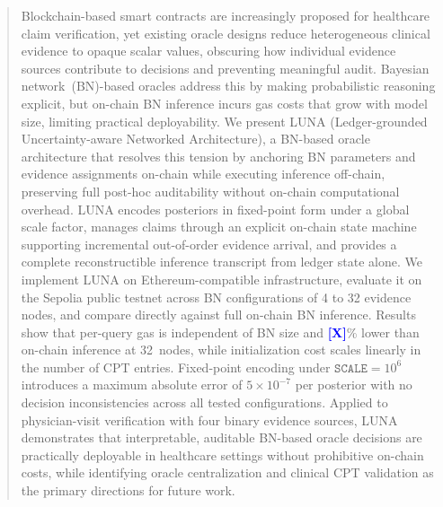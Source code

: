 \documentclass[journal]{IEEEtran}
\newcommand{\placeholder}[1]{\textcolor{blue}{\textbf{[#1]}}}
\begin{document}
\begin{abstract}
Blockchain-based smart contracts are increasingly proposed
for healthcare claim verification, yet existing oracle designs
reduce heterogeneous clinical evidence to opaque scalar values,
obscuring how individual evidence sources contribute to
decisions and preventing meaningful audit.
Bayesian network~(BN)-based oracles address this by making
probabilistic reasoning explicit, but on-chain BN inference
incurs gas costs that grow with model size, limiting practical
deployability.
We present LUNA (Ledger-grounded Uncertainty-aware Networked
Architecture), a BN-based oracle architecture that resolves
this tension by anchoring BN parameters and evidence
assignments on-chain while executing inference off-chain,
preserving full post-hoc auditability without on-chain
computational overhead.
LUNA encodes posteriors in fixed-point form under a global
scale factor, manages claims through an explicit on-chain
state machine supporting incremental out-of-order evidence
arrival, and provides a complete reconstructible inference
transcript from ledger state alone.
We implement LUNA on Ethereum-compatible infrastructure,
evaluate it on the Sepolia public testnet across BN
configurations of 4 to 32 evidence nodes, and compare
directly against full on-chain BN inference.
Results show that per-query gas is independent of BN size
and \placeholder{X}\% lower than on-chain inference at
32~nodes, while initialization cost scales linearly in the
number of CPT entries.
Fixed-point encoding under $\texttt{SCALE}=10^6$ introduces
a maximum absolute error of $5{\times}10^{-7}$ per posterior
with no decision inconsistencies across all tested
configurations.
Applied to physician-visit verification with four binary
evidence sources, LUNA demonstrates that interpretable,
auditable BN-based oracle decisions are practically
deployable in healthcare settings without prohibitive
on-chain costs, while identifying oracle centralization
and clinical CPT validation as the primary directions for
future work.
\end{abstract}
\end{document}
